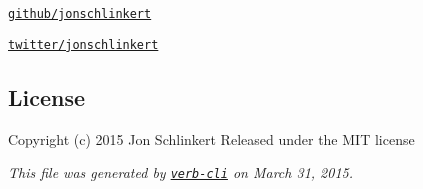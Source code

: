 \begin{DoxyItemize}
\item \href{https://github.com/jonschlinkert}{\tt github/jonschlinkert}
\item \href{http://twitter.com/jonschlinkert}{\tt twitter/jonschlinkert}
\end{DoxyItemize}

\subsection*{License}

Copyright (c) 2015 Jon Schlinkert Released under the M\+IT license





{\itshape This file was generated by \href{https://github.com/assemble/verb-cli}{\tt verb-\/cli} on March 31, 2015.} 